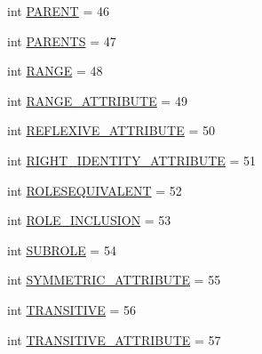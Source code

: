 \begin{DoxyCompactItemize}
\item 
int \hyperlink{interfacede_1_1uulm_1_1ecs_1_1ai_1_1owlapi_1_1krssparser_1_1_k_r_s_s2_parser_constants_aaf80013f8b4f6dba2e45d75e525e3830}{P\-A\-R\-E\-N\-T} = 46
\item 
int \hyperlink{interfacede_1_1uulm_1_1ecs_1_1ai_1_1owlapi_1_1krssparser_1_1_k_r_s_s2_parser_constants_adf7bf502909a4c4f9f6c95894d088171}{P\-A\-R\-E\-N\-T\-S} = 47
\item 
int \hyperlink{interfacede_1_1uulm_1_1ecs_1_1ai_1_1owlapi_1_1krssparser_1_1_k_r_s_s2_parser_constants_a60c879920b60415cc3fb3bcfaff60171}{R\-A\-N\-G\-E} = 48
\item 
int \hyperlink{interfacede_1_1uulm_1_1ecs_1_1ai_1_1owlapi_1_1krssparser_1_1_k_r_s_s2_parser_constants_ad501666bae1047920adac58baacb636c}{R\-A\-N\-G\-E\-\_\-\-A\-T\-T\-R\-I\-B\-U\-T\-E} = 49
\item 
int \hyperlink{interfacede_1_1uulm_1_1ecs_1_1ai_1_1owlapi_1_1krssparser_1_1_k_r_s_s2_parser_constants_ac5919970dc05beb45feab5f6fae9e88a}{R\-E\-F\-L\-E\-X\-I\-V\-E\-\_\-\-A\-T\-T\-R\-I\-B\-U\-T\-E} = 50
\item 
int \hyperlink{interfacede_1_1uulm_1_1ecs_1_1ai_1_1owlapi_1_1krssparser_1_1_k_r_s_s2_parser_constants_ab98b23386a6304b17630a9d2fce4daa2}{R\-I\-G\-H\-T\-\_\-\-I\-D\-E\-N\-T\-I\-T\-Y\-\_\-\-A\-T\-T\-R\-I\-B\-U\-T\-E} = 51
\item 
int \hyperlink{interfacede_1_1uulm_1_1ecs_1_1ai_1_1owlapi_1_1krssparser_1_1_k_r_s_s2_parser_constants_aec13d9931b6e0b64231a7d659b28d247}{R\-O\-L\-E\-S\-E\-Q\-U\-I\-V\-A\-L\-E\-N\-T} = 52
\item 
int \hyperlink{interfacede_1_1uulm_1_1ecs_1_1ai_1_1owlapi_1_1krssparser_1_1_k_r_s_s2_parser_constants_a11b749563213d4b3cbf4d91ddfd5165e}{R\-O\-L\-E\-\_\-\-I\-N\-C\-L\-U\-S\-I\-O\-N} = 53
\item 
int \hyperlink{interfacede_1_1uulm_1_1ecs_1_1ai_1_1owlapi_1_1krssparser_1_1_k_r_s_s2_parser_constants_a002d8d05bf150a8150df52dcb12bdd9e}{S\-U\-B\-R\-O\-L\-E} = 54
\item 
int \hyperlink{interfacede_1_1uulm_1_1ecs_1_1ai_1_1owlapi_1_1krssparser_1_1_k_r_s_s2_parser_constants_a44841df31549983b99358dea814a193b}{S\-Y\-M\-M\-E\-T\-R\-I\-C\-\_\-\-A\-T\-T\-R\-I\-B\-U\-T\-E} = 55
\item 
int \hyperlink{interfacede_1_1uulm_1_1ecs_1_1ai_1_1owlapi_1_1krssparser_1_1_k_r_s_s2_parser_constants_ab9422257ab7b25d4f2f06ae05c51eb21}{T\-R\-A\-N\-S\-I\-T\-I\-V\-E} = 56
\item 
int \hyperlink{interfacede_1_1uulm_1_1ecs_1_1ai_1_1owlapi_1_1krssparser_1_1_k_r_s_s2_parser_constants_a29babd230e44d824319721a1dd5c8dfa}{T\-R\-A\-N\-S\-I\-T\-I\-V\-E\-\_\-\-A\-T\-T\-R\-I\-B\-U\-T\-E} = 57

\end{DoxyCompactItemize}
